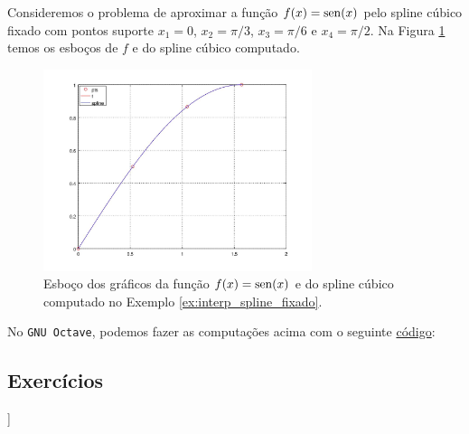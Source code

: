 \begin{ex}\label{ex:interp_spline_fixado}
  Consideremos o problema de aproximar a função $f(x)=\operatorname{sen}(x)$ pelo spline cúbico fixado com pontos suporte $x_1=0$, $x_2=\pi/3$, $x_3=\pi/6$ e $x_4=\pi/2$. Na Figura \ref{fig:interp_spline_fixado} temos os esboços de $f$ e do spline cúbico computado.

  \begin{figure}[h!]
    \centering
    \includegraphics[width=0.7\textwidth]{./cap_interp/dados/ex_interp_spline_fixado/fig_interp_spline_fixado}
    \caption{Esboço dos gráficos da função $f(x)=\operatorname{sen}(x)$ e do spline cúbico computado no Exemplo \ref{ex:interp_spline_fixado}.}
    \label{fig:interp_spline_fixado}
  \end{figure}

\ifisoctave
No \verb+GNU Octave+, podemos fazer as computações acima com o seguinte \href{https://github.com/phkonzen/notas/blob/master/src/MatematicaNumerica/cap_interp/dados/ex_interp_spline_fixado/ex_interp_spline_fixado.m}{código}:

\fi
\end{ex}

\subsection*{Exercícios}

\begin{flushleft}
  [[tag:construcao]]
\end{flushleft}
